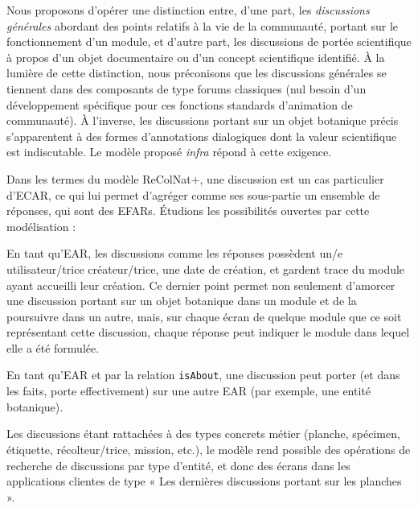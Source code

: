 \startchapter[title={Le modèle de discussions}]

\startsection[title={Discussions ciblées & discussions générales}]

Nous proposons d'opérer une distinction entre, d'une part, les {\em discussions générales} abordant des points relatifs à la vie de la communauté, portant sur le fonctionnement d'un module, et d'autre part, les discussions de portée scientifique à propos d'un objet documentaire ou d'un concept scientifique identifié.
À la lumière de cette distinction, nous préconisons que les discussions générales se tiennent dans des composants de type forums classiques (nul besoin d'un développement spécifique pour ces fonctions standards d'animation de communauté).
À l'inverse, les discussions portant sur un objet botanique précis s'apparentent à des formes d'annotations dialogiques dont la valeur scientifique est indiscutable.
Le modèle proposé {\it infra} répond à cette exigence.

\stopsection
\startsection[title={Le modèle de discussions},reference=model:discussions]


Dans les termes du modèle ReColNat+, une discussion est un cas particulier d'ECAR, ce qui lui permet d'agréger comme ses sous-partie un ensemble de réponses, qui sont des EFARs.
Étudions les possibilités ouvertes par cette modélisation :

\startitemize
\item En tant qu'EAR, les discussions comme les réponses possèdent un/e utilisateur/trice créateur/trice, une date de création, et gardent trace du module ayant accueilli leur création. Ce dernier point permet non seulement d'amorcer une discussion portant sur un objet botanique dans un module et de la poursuivre dans un autre, mais, sur chaque écran de quelque module que ce soit représentant cette discussion, chaque réponse peut indiquer le module dans lequel elle a été formulée.
\item En tant qu'EAR et par la relation {\tt isAbout}, une discussion peut porter (et dans les faits, porte effectivement) sur une autre EAR (par exemple, une entité botanique).
\item Les discussions étant rattachées à des types concrets métier (planche, spécimen, étiquette, récolteur/trice, mission, etc.), le modèle rend possible des opérations de recherche de discussions par type d'entité, et donc des écrans dans les applications clientes de type « Les dernières discussions portant sur les planches ».
\stopitemize

\stopsection
\stopchapter